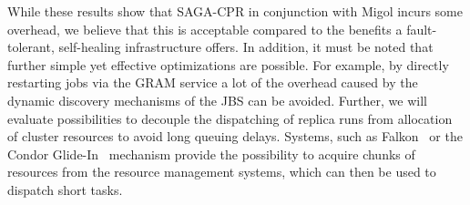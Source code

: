 \documentclass{rspublic}
\newcommand{\jhanote}[1]{ {\textcolor{red} { ***SJ: #1 }}}
\newcommand{\jhanote}[1]{}
\begin{document}
While these results show that SAGA-CPR in conjunction with Migol
incurs some overhead, we believe that this is acceptable compared to
the benefits a fault-tolerant, self-healing infrastructure offers. In
addition, it must be noted that further simple yet effective
optimizations are possible. For example, by directly restarting jobs
via the GRAM service a lot of the overhead caused by the dynamic
discovery mechanisms of the JBS can be avoided. Further, we will
evaluate possibilities to decouple the dispatching of replica runs
from allocation of cluster resources to avoid long queuing
delays. Systems, such as Falkon~\cite{1362680} or the Condor
Glide-In~\cite{citeulike:291860} mechanism provide the possibility to
acquire chunks of resources from the resource management systems,
which can then be used to dispatch short tasks. 


\end{document}
